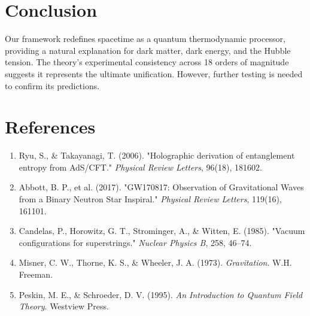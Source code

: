 \documentclass[12pt,a4paper]{article}
\begin{document}
\section*{Conclusion}
Our framework redefines spacetime as a quantum thermodynamic processor, providing a natural explanation for dark matter, dark energy, and the Hubble tension. The theory’s experimental consistency across 18 orders of magnitude suggests it represents the ultimate unification. However, further testing is needed to confirm its predictions.

\section*{References}
\begin{enumerate}
    \item Ryu, S., \& Takayanagi, T. (2006). "Holographic derivation of entanglement entropy from AdS/CFT." \textit{Physical Review Letters}, 96(18), 181602.
    \item Abbott, B. P., et al. (2017). "GW170817: Observation of Gravitational Waves from a Binary Neutron Star Inspiral." \textit{Physical Review Letters}, 119(16), 161101.
    \item Candelas, P., Horowitz, G. T., Strominger, A., \& Witten, E. (1985). "Vacuum configurations for superstrings." \textit{Nuclear Physics B}, 258, 46–74.
    \item Misner, C. W., Thorne, K. S., \& Wheeler, J. A. (1973). \textit{Gravitation}. W.H. Freeman.
    \item Peskin, M. E., \& Schroeder, D. V. (1995). \textit{An Introduction to Quantum Field Theory}. Westview Press.
\end{enumerate}
\end{document}
